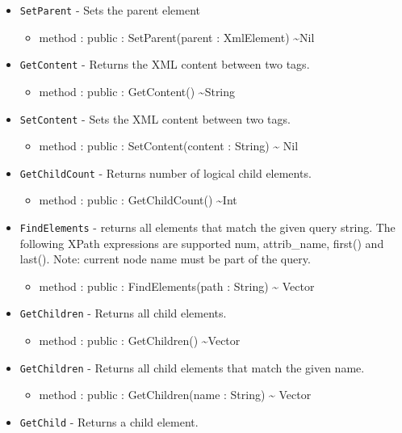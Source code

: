 \documentclass[11pt]{article}
\begin{document}
\begin{itemize}
\begin{itemize}
  \end{itemize}
\item \texttt{SetParent} - Sets the parent element
  \begin{itemize}
  \item method : public : SetParent(parent : XmlElement)
    \textasciitilde Nil
  \end{itemize}
\item \texttt{GetContent} - Returns the XML content between two tags.
  \begin{itemize}
  \item method : public : GetContent() \textasciitilde String
  \end{itemize}
\item \texttt{SetContent} - Sets the XML content between two tags.
  \begin{itemize}
  \item method : public : SetContent(content : String) \textasciitilde
    Nil
  \end{itemize}
\item \texttt{GetChildCount} - Returns number of logical child
  elements.
  \begin{itemize}
  \item method : public : GetChildCount() \textasciitilde Int
  \end{itemize}
\item \texttt{FindElements} - returns all elements that match the
  given query string.  The following XPath expressions are supported
  num, attrib\_name, first() and last().  Note: current node name must
  be part of the query.
  \begin{itemize}
  \item method : public : FindElements(path : String) \textasciitilde
    Vector
  \end{itemize}
\item \texttt{GetChildren} - Returns all child elements.
  \begin{itemize}
  \item method : public : GetChildren() \textasciitilde Vector
  \end{itemize}
\item \texttt{GetChildren} - Returns all child elements that match the
  given name.
  \begin{itemize}
  \item method : public : GetChildren(name : String) \textasciitilde
    Vector
  \end{itemize}
\item \texttt{GetChild} - Returns a child element.

\end{itemize}
\end{document}
